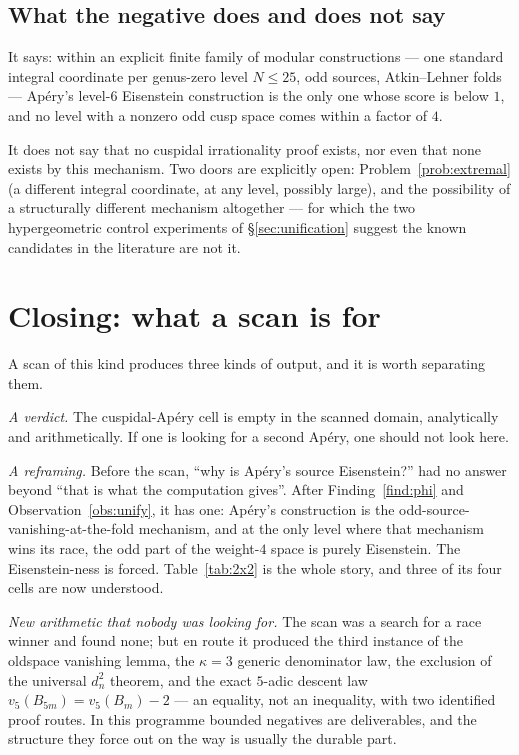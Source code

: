 \documentclass[11pt,reqno]{amsart}
\theoremstyle{plain}
\theoremstyle{definition}
\theoremstyle{remark}
\newcommand{\dn}{d_n}
\begin{document}
\subsection{What the negative does and does not say}

It says: within an explicit finite family of modular constructions ---
one standard integral coordinate per genus-zero level $N\le25$, odd
sources, Atkin--Lehner folds --- Ap\'ery's level-$6$ Eisenstein
construction is the only one whose score is below $1$, and no level with
a nonzero odd cusp space comes within a factor of $4$.

It does not say that no cuspidal irrationality proof exists, nor even
that none exists by this mechanism. Two doors are explicitly open:
Problem~\ref{prob:extremal} (a different integral coordinate, at any
level, possibly large), and the possibility of a structurally different
mechanism altogether --- for which the two hypergeometric control
experiments of \S\ref{sec:unification} suggest the known candidates in
the literature are not it.

\section{Closing: what a scan is for}
\label{sec:closing}

A scan of this kind produces three kinds of output, and it is worth
separating them.

\emph{A verdict.} The cuspidal-Ap\'ery cell is empty in the scanned
domain, analytically and arithmetically. If one is looking for a second
Ap\'ery, one should not look here.

\emph{A reframing.} Before the scan, ``why is Ap\'ery's source
Eisenstein?'' had no answer beyond ``that is what the computation gives''.
After Finding~\ref{find:phi} and Observation~\ref{obs:unify}, it has one:
Ap\'ery's construction is the odd-source-vanishing-at-the-fold mechanism,
and at the only level where that mechanism wins its race, the odd part of
the weight-$4$ space is purely Eisenstein. The Eisenstein-ness is forced.
Table~\ref{tab:2x2} is the whole story, and three of its four cells are
now understood.

\emph{New arithmetic that nobody was looking for.} The scan was a search
for a race winner and found none; but en route it produced the third
instance of the oldspace vanishing lemma, the $\kappa=3$ generic
denominator law, the exclusion of the universal $\dn^2$ theorem, and the
exact $5$-adic descent law $v_5(B_{5m})=v_5(B_m)-2$ --- an equality, not
an inequality, with two identified proof routes. In this programme
bounded negatives are deliverables, and the structure they force out on
the way is usually the durable part.
\end{document}
